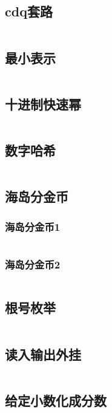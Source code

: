 \documentclass{article}
\begin{document}
\subsection{cdq套路}
\inputminted[breaklines]{text}{../其他/cdq.cpp}

\subsection{最小表示}
\inputminted[breaklines]{c++}{../其他/最小表示.cpp}

\subsection{十进制快速幂}
\inputminted[breaklines]{c++}{../其他/十进制快速幂.cpp}

\subsection{数字哈希}
\inputminted[breaklines]{c++}{../其他/数字哈希.cpp}

\subsection{海岛分金币}
\subsubsection{海岛分金币1}
\inputminted[breaklines]{c++}{../其他/海岛分金币1.cpp}

\subsubsection{海岛分金币2}
\inputminted[breaklines]{c++}{../其他/海岛分金币2.cpp}

\subsection{根号枚举}
\inputminted[breaklines]{c++}{../其他/根号枚举.cpp}

\subsection{读入输出外挂}
\inputminted[breaklines]{c++}{../其他/读入输出外挂.cpp}

\subsection{给定小数化成分数}
\inputminted[breaklines]{python}{../其他/给定小数化成分数.py}
\end{document}
